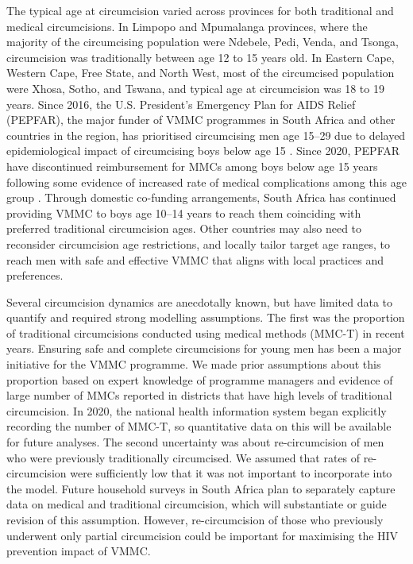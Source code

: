 \documentclass{article}
\begin{document}
The typical age at circumcision varied across provinces for both traditional and medical circumcisions. In Limpopo and Mpumalanga provinces, where the majority of the circumcising population were Ndebele, Pedi, Venda, and Tsonga, circumcision was traditionally between age 12 to 15 years old. In Eastern Cape, Western Cape, Free State, and North West, most of the circumcised population were Xhosa, Sotho, and Tswana, and typical age at circumcision was 18 to 19 years. Since 2016, the U.S. President's Emergency Plan for AIDS Relief (PEPFAR), the major funder of VMMC programmes in South Africa and other countries in the region, has prioritised circumcising men age 15--29 due to delayed epidemiological impact of circumcising boys below age 15 \cite{davis2018progress}. Since 2020, PEPFAR have discontinued reimbursement for MMCs among boys below age 15 years following some evidence of increased rate of medical complications among this age group \cite{world2020preventing}. Through domestic co-funding arrangements, South Africa has continued providing VMMC to boys age 10--14 years to reach them coinciding with preferred traditional circumcision ages. Other countries may also need to reconsider circumcision age restrictions, and locally tailor target age ranges, to reach men with safe and effective VMMC that aligns with local practices and preferences.

Several circumcision dynamics are anecdotally known, but have limited data to quantify and required strong modelling assumptions. The first was  the proportion of traditional circumcisions conducted using medical methods (MMC-T) in recent years. Ensuring safe and complete circumcisions for young men has been a major initiative for the VMMC programme. We made prior assumptions about this proportion based on expert knowledge of programme managers and evidence of large number of MMCs reported in districts that have high levels of traditional circumcision. In 2020, the national health information system began explicitly recording the number of MMC-T, so quantitative data on this will be available for future analyses. The second uncertainty was about re-circumcision of men who were previously traditionally circumcised. We assumed that rates of re-circumcision were sufficiently low that it was not important to incorporate into the model. Future household surveys in South Africa plan to separately capture data on medical and traditional circumcision, which will substantiate or guide revision of this assumption. However, re-circumcision of those who previously underwent only partial circumcision could be important for maximising the HIV prevention impact of VMMC.
\end{document}
